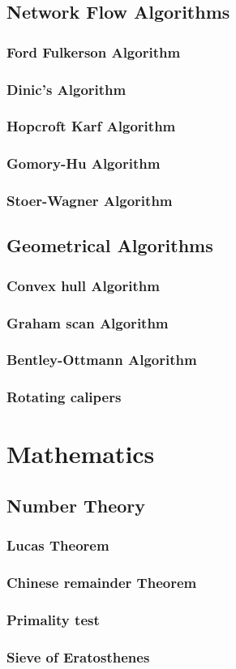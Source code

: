 \documentclass[10pt,landscape,twocolumn]{article}
\begin{document}
\subsection{Network Flow Algorithms}
\subsubsection{Ford Fulkerson Algorithm}
\subsubsection{Dinic's Algorithm}
\subsubsection{Hopcroft Karf Algorithm}
\subsubsection{Gomory-Hu Algorithm}
\subsubsection{Stoer-Wagner Algorithm}

\subsection{Geometrical Algorithms}
\subsubsection{Convex hull Algorithm}
\subsubsection{Graham scan Algorithm}
\subsubsection{Bentley-Ottmann Algorithm}
\subsubsection{Rotating calipers}

\section{Mathematics}

\subsection{Number Theory}
\subsubsection{Lucas Theorem}
\subsubsection{Chinese remainder Theorem}
\subsubsection{Primality test}
\subsubsection{Sieve of Eratosthenes}

\end{document}
